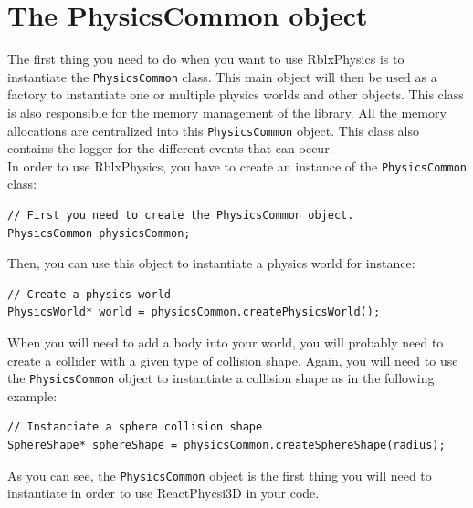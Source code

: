 \documentclass[a4paper,12pt]{article}
\begin{document}
   \section{The PhysicsCommon object}
     \label{sec:physicscommon}

   The first thing you need to do when you want to use RblxPhysics is to instantiate the \texttt{PhysicsCommon} class.
   This main object will then be used as a factory to instantiate one or multiple physics worlds and other objects. This class is also
   responsible for the memory management of the library. All the memory allocations are centralized into this \texttt{PhysicsCommon} object.
   This class also contains the logger for the different events that can occur. \\

   In order to use RblxPhysics, you have to create an instance of the \texttt{PhysicsCommon} class: \\

   \begin{lstlisting}
// First you need to create the PhysicsCommon object. 
PhysicsCommon physicsCommon;
   \end{lstlisting}

    \vspace{0.6cm}

   Then, you can use this object to instantiate a physics world for instance: \\

   \begin{lstlisting}
// Create a physics world
PhysicsWorld* world = physicsCommon.createPhysicsWorld();
   \end{lstlisting}

    \vspace{0.6cm}

   When you will need to add a body into your world, you will probably need to create a collider with a given type of collision shape. 
   Again, you will need to use the \texttt{PhysicsCommon} object to instantiate a collision shape as in the following example: \\

   \begin{lstlisting}
// Instanciate a sphere collision shape
SphereShape* sphereShape = physicsCommon.createSphereShape(radius);
   \end{lstlisting}

   \vspace{0.6cm}

   As you can see, the \texttt{PhysicsCommon} object is the first thing you will need to instantiate in order to use ReactPhycsi3D in your code.
\end{document}
